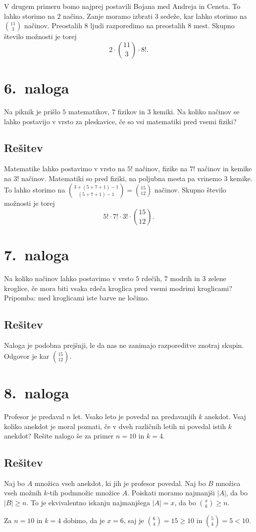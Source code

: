 \documentclass[11pt]{article}
\begin{document}
    V drugem primeru bomo najprej postavili Bojana med Andreja in Ceneta. To lahko storimo na \(2\) načina.
    Zanje moramo izbrati \(3\) sedeže, kar lahko storimo na \(\binom{11}{3}\) načinov. Preostalih \(8\) ljudi razporedimo na preostalih \(8\) mest.
    Skupno število možnosti je torej
    \[2 \cdot \binom{11}{3} \cdot 8!.\]

\section*{6.~naloga}
Na piknik je prišlo \(5\) matematikov, \(7\) fizikov in \(3\) kemiki. Na koliko načinov se lahko postavijo
v vrsto za pleskavice, če so vsi matematiki pred vsemi fiziki?

\subsection*{Rešitev}
    Matematike lahko postavimo v vrsto na \(5!\) načinov, fizike na \(7!\) načinov in kemike na \(3!\) načinov. 
    Matematiki so pred fiziki, na poljubna mesta pa vrinemo \(3\) kemike.
    To lahko storimo na \(\binom{3 + \left(5 + 7 + 1\right) - 1}{\left(5 + 7 + 1\right) - 1} = \binom{15}{12}\) načinov. Skupno število možnosti je torej
    \[5! \cdot 7! \cdot 3! \cdot \binom{15}{12}.\]

\section*{7.~naloga}
Na koliko načinov lahko postavimo v vrsto \(5\) rdečih, \(7\) modrih in \(3\) zelene kroglice, če mora
biti vsaka rdeča kroglica pred vsemi modrimi kroglicami?
Pripomba: med kroglicami iste barve ne ločimo.

\subsection*{Rešitev}
    Naloga je podobna prejšnji, le da nas ne zanimajo razporeditve znotraj skupin.
    Odgovor je kar \(\binom{15}{12}\).

\section*{8.~naloga}
Profesor je predaval \(n\) let. Vsako leto je povedal na predavanjih \(k\) anekdot. Vsaj koliko
anekdot je moral poznati, če v dveh različnih letih ni povedal istih \(k\) anekdot? Rešite nalogo
še za primer \(n = 10\) in \(k = 4\).

\subsection*{Rešitev}
    Naj bo \(A\) množica vseh anekdot, ki jih je profesor povedal. Naj bo \(B\) množica vseh možnih \(k\)-tih podmnožic množice \(A\).
    Poiskati moramo najmanjši \(|A|\), da bo \(|B| \ge n\). To je ekvivalentno iskanju najmanjšega \(|A| = x\), da bo \(\binom{x}{k} \ge n\).
    
    Za \(n = 10\) in \(k = 4\) dobimo, da je \(x = 6\), saj je \(\binom{6}{4} = 15 \ge 10\) in \(\binom{5}{4} = 5 < 10\).
\end{document}
